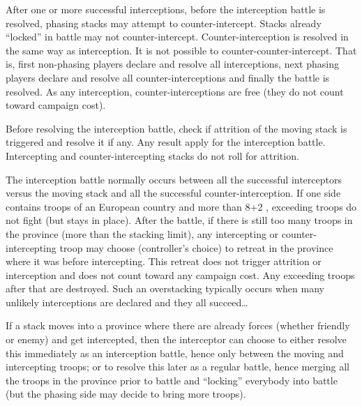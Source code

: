 After one or more successful interceptions, before the interception battle is
resolved, phasing stacks may attempt to counter-intercept. Stacks already
``locked'' in battle may not counter-intercept. Counter-interception is
resolved in the same way as interception. It is not possible to
counter-counter-intercept. That is, first non-phasing players declare and
resolve all interceptions, next phasing players declare and resolve all
counter-interceptions and finally the battle is resolved. As any interception,
counter-interceptions are free (they do not count toward campaign cost).

Before resolving the interception battle, check if attrition of the moving
stack is triggered and resolve it if any. Any  result apply
for the interception battle. Intercepting and counter-intercepting stacks do
not roll for attrition.

The interception battle normally occurs between all the successful
interceptors versus the moving stack and all the successful
counter-interception. If one side contains troops of an European country and
more than 8\LD+2 \Pashas, exceeding troops do not fight (but stays in
place). After the battle, if there is still too many troops in the province
(more than the stacking limit), any intercepting or counter-intercepting troop
may choose (controller's choice) to retreat in the province where it was
before intercepting. This retreat does not trigger attrition or interception
and does not count toward any campaign cost. Any exceeding troops after that
are destroyed. Such an overstacking typically occurs when many unlikely
interceptions are declared and they all succeed\ldots

If a stack moves into a province where there are already forces (whether
friendly or enemy) and get intercepted, then the interceptor can choose to
either resolve this immediately as an interception battle, hence only between
the moving and intercepting troops; or to resolve this later as a regular
battle, hence merging all the troops in the province prior to battle and
``locking'' everybody into battle (but the phasing side may decide to bring
more troops).

